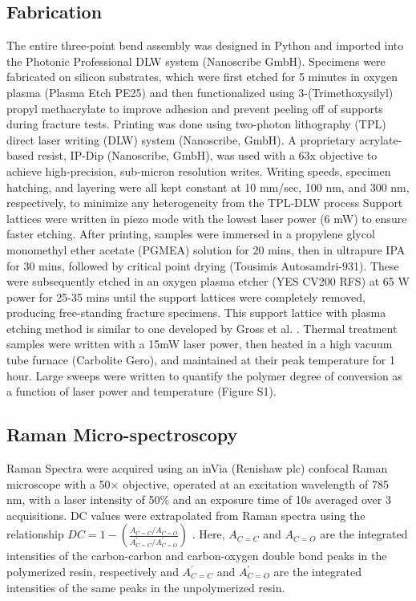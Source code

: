 \documentclass[11pt]{article}
\begin{document}
    \subsection*{Fabrication} \label{Materials and Methods}
        The entire three-point bend assembly was designed in Python and imported into the Photonic Professional DLW system (Nanoscribe GmbH).
        Specimens were fabricated on silicon substrates, which were first etched for 5 minutes in oxygen plasma (Plasma Etch PE25) and then functionalized using 3-(Trimethoxysilyl) propyl methacrylate to improve adhesion and prevent peeling off of supports during fracture tests. 
        Printing was done using two-photon lithography (TPL) direct laser writing (DLW) system (Nanoscribe, GmbH).
        A proprietary acrylate-based resist, IP-Dip (Nanoscribe, GmbH), was used with a 63x objective to achieve high-precision, sub-micron resolution writes. 
        Writing speeds, specimen hatching, and layering were all kept constant at 10 mm/sec, 100 nm, and 300 nm, respectively, to minimize any heterogeneity from the TPL-DLW process
        Support lattices were written in piezo mode with the lowest laser power (6 mW) to ensure faster etching. 
        After printing, samples were immersed in a propylene glycol monomethyl ether acetate (PGMEA) solution for 20 mins, then in ultrapure IPA for 30 mins, followed by critical point drying (Tousimis Autosamdri-931). 
        These were subsequently etched in an oxygen plasma etcher (YES CV200 RFS) at 65 W power for 25-35 mins until the support lattices were completely removed, producing free-standing fracture specimens.
        This support lattice with plasma etching method is similar to one developed by Gross et al. \cite{gross2019additive}. 
        Thermal treatment samples were written with a 15mW laser power, then heated in a high vacuum tube furnace (Carbolite Gero), and maintained at their peak temperature for 1 hour.
        Large sweeps were written to quantify the polymer degree of conversion as a function of laser power and temperature (Figure S1).

    \subsection*{Raman Micro-spectroscopy}
        Raman Spectra were acquired using an inVia (Renishaw plc) confocal Raman microscope with a 50× objective, operated at an excitation wavelength of 785 nm, with a laser intensity of 50\% and an exposure time of 10s averaged over 3 acquisitions.
        DC values were extrapolated from Raman spectra using the relationship 
        $DC = 1 - (\frac{A_{C=C}/A_{C=O}}{A^{'}_{C=C}/A^{'}_{C=O}})$ \cite{baldacchini2009characterization}.
        Here, $A_{C=C}$ and $A_{C=O}$ are the integrated intensities of the carbon-carbon and carbon-oxygen double bond peaks in the polymerized resin, respectively and $A^{'}_{C=C}$ and $A^{'}_{C=O}$ are the integrated intensities of the same peaks in the unpolymerized resin.
\end{document}
